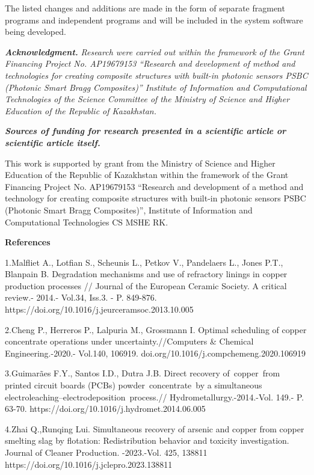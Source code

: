 The listed changes and additions are made in the form of separate
fragment programs and independent programs and will be included in the
system software being developed.

\emph{\textbf{Acknowledgment.}} \emph{Research were carried out within
the framework of the Grant Financing Project No. AP19679153 ``Research
and development of method and technologies for creating composite
structures with built-in photonic sensors PSBC (Photonic Smart Bragg
Composites)'' Institute of Information and Computational Technologies of
the Science Committee of the Ministry of Science and Higher Education of
the Republic of Kazakhstan.}

\emph{\textbf{Sources of funding for research presented in a scientific
article or scientific article itself.}}

This work is supported by grant from the Ministry of Science and Higher
Education of the Republic of Kazakhstan within the framework of the
Grant Financing Project No. AP19679153 ``Research and development of a
method and technology for creating composite structures with built-in
photonic sensors PSBC (Photonic Smart Bragg Composites)'', Institute of
Information and Computational Technologies CS MSHE RK.

\textbf{References}

1.Malfliet A., Lotfian S., Scheunis L., Petkov V., Pandelaers L., Jones
P.T., Blanpain B. Degradation mechanisms and use of refractory linings
in copper production processes // Journal of the European Ceramic
Society. A critical review.- 2014.- Vol.34, Iss.3. - P. 849-876.
https://doi.org/10.1016/j.jeurceramsoc.2013.10.005

2.Cheng P., Herreros P., Lalpuria M., Grossmann I. Optimal scheduling of
copper concentrate operations under uncertainty.//Computers \& Chemical
Engineering.-2020.- Vol.140, 106919.
doi.org/10.1016/j.compchemeng.2020.106919

3.Guimarães F.Y., Santos I.D., Dutra J.B. Direct recovery of~copper~from
printed circuit boards (PCBs) powder~concentrate~by a simultaneous
electroleaching--electrodeposition~process.//
Hydrometallurgy.-2014.-Vol. 149.- P. 63-70.
https://doi.org/10.1016/j.hydromet.2014.06.005

4.Zhai Q.,Runqing Lui. Simultaneous recovery of arsenic and copper from
copper smelting slag by flotation: Redistribution behavior and toxicity
investigation. Journal of Cleaner Production. -2023.-Vol. 425, 138811
https://doi.org/10.1016/j.jclepro.2023.138811

